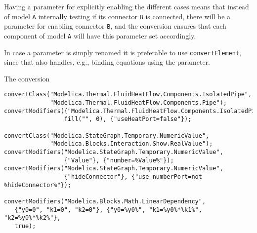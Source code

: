 \begin{nonnormative}
Having a parameter for explicitly enabling the different cases means that instead of model \lstinline!A! internally testing if its connector \lstinline!B! is connected, there will be a parameter for enabling connector \lstinline!B!, and the conversion ensures that each component of model \lstinline!A! will have this parameter set accordingly.

In case a parameter is simply renamed it is preferable to use \lstinline!convertElement!, since that also handles, e.g., binding equations using the parameter.
\end{nonnormative}

\begin{example}
The conversion
\begin{lstlisting}[language=modelica]
convertClass("Modelica.Thermal.FluidHeatFlow.Components.IsolatedPipe",
             "Modelica.Thermal.FluidHeatFlow.Components.Pipe");
convertModifiers({"Modelica.Thermal.FluidHeatFlow.Components.IsolatedPipe"},
                 fill("", 0), {"useHeatPort=false"});

convertClass("Modelica.StateGraph.Temporary.NumericValue",
             "Modelica.Blocks.Interaction.Show.RealValue");
convertModifiers("Modelica.StateGraph.Temporary.NumericValue",
                 {"Value"}, {"number=%Value%"});
convertModifiers("Modelica.StateGraph.Temporary.NumericValue",
                 {"hideConnector"}, {"use_numberPort=not %hideConnector%"});

convertModifiers("Modelica.Blocks.Math.LinearDependency",
   {"y0=0", "k1=0", "k2=0"}, {"y0=%y0%", "k1=%y0%*%k1%", "k2=%y0%*%k2%"},
   true);


\end{lstlisting}
\end{example}
